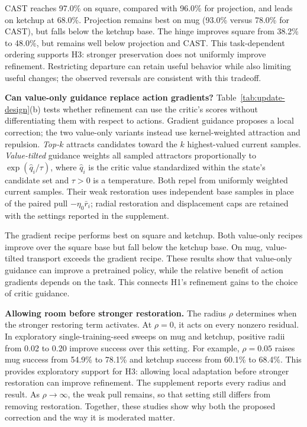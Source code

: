CAST reaches 97.0\% on square, compared with 96.0\% for projection,
and leads on ketchup at 68.0\%. Projection remains best on mug
(93.0\% versus 78.0\% for CAST), but falls below the ketchup base.
The hinge improves square from 38.2\% to 48.0\%, but remains well below
projection and CAST. This task-dependent ordering supports H3:
stronger preservation does not uniformly improve refinement. Restricting
departure can retain useful behavior while also limiting useful changes;
the observed reversals are consistent with this tradeoff.

\textbf{Can value-only guidance replace action gradients?}
Table~\ref{tab:update-design}(b) tests whether refinement can use the
critic's scores without differentiating them with respect to actions.
Gradient guidance proposes a local correction; the two value-only
variants instead use kernel-weighted attraction and repulsion.
\emph{Top-$k$} attracts candidates toward the $k$ highest-valued current
samples. \emph{Value-tilted} guidance weights all sampled attractors
proportionally to $\exp(\hat q_i/\tau)$, where $\hat q_i$ is the critic
value standardized within the state's candidate set and $\tau>0$ is a
temperature.
Both repel from uniformly weighted current samples. Their weak
restoration uses independent base samples in place of the paired pull
$-\eta_0\bar r_i$; radial restoration and displacement caps are retained
with the settings reported in the supplement.

The gradient recipe performs best on square and ketchup. Both value-only
recipes improve over the square base but fall below the ketchup base.
On mug, value-tilted transport exceeds the gradient recipe. These results
show that value-only guidance can improve a pretrained policy, while the
relative benefit of action gradients depends on the task. This connects
H1's refinement gains to the choice of critic guidance.

\textbf{Allowing room before stronger restoration.}
The radius $\rho$ determines when the stronger restoring term activates.
At $\rho=0$, it acts on every nonzero residual. In exploratory
single-training-seed sweeps on mug and ketchup, positive radii from
0.02 to 0.20 improve success over this setting. For example, $\rho=0.05$
raises mug success from 54.9\% to 78.1\% and ketchup success from 60.1\%
to 68.4\%. This provides exploratory support for H3: allowing local
adaptation before stronger restoration can improve refinement. The
supplement reports every radius and result. As $\rho\to\infty$, the weak pull remains, so that
setting still differs from removing restoration. Together, these studies
show why both the proposed correction and the way it is moderated matter.

